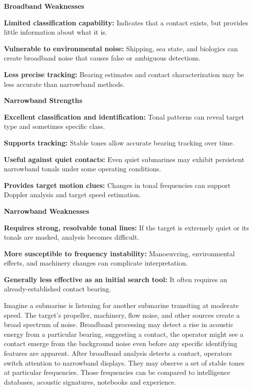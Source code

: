 \textbf{Broadband Weaknesses}
\begin{compactitem}
    \item \textbf{Limited classification capability:} Indicates that a contact exists, but provides little information about what it is.
    \item \textbf{Vulnerable to environmental noise:} Shipping, sea state, and biologics can create broadband noise that causes false or ambiguous detections.
    \item \textbf{Less precise tracking:} Bearing estimates and contact characterization may be less accurate than narrowband methods.
\end{compactitem}

\textbf{Narrowband Strengths}
\begin{compactitem}
    \item \textbf{Excellent classification and identification:} Tonal patterns can reveal target type and sometimes specific class.
    \item \textbf{Supports tracking:} Stable tones allow accurate bearing tracking over time.
    \item \textbf{Useful against quiet contacts:} Even quiet submarines may exhibit persistent narrowband tonals under some operating conditions.
    \item \textbf{Provides target motion clues:} Changes in tonal frequencies can support Doppler analysis and target speed estimation.
\end{compactitem}

\textbf{Narrowband Weaknesses}
\begin{compactitem}
    \item \textbf{Requires strong, resolvable tonal lines:} If the target is extremely quiet or its tonals are masked, analysis becomes difficult.
    \item \textbf{More susceptible to frequency instability:} Manoeuvring, environmental effects, and machinery changes can complicate interpretation.
    \item \textbf{Generally less effective as an initial search tool:} It often requires an already-established contact bearing.
\end{compactitem}

Imagine a submarine is listening for another submarine transiting at moderate speed. The target's propeller, machinery, flow noise, and other sources create a broad spectrum of noise. Broadband processing may detect a rise in acoustic energy from a particular bearing, suggesting a contact, the operator might see a contact emerge from the background noise even before any specific identifying features are apparent. After broadband analysis detects a contact, operators switch attention to narrowband displays. They may observe a set of stable tones at particular frequencies. Those frequencies can be compared to intelligence databases, acoustic signatures, notebooks and experience.


